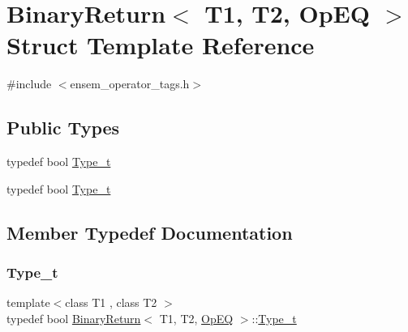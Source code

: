 \hypertarget{structBinaryReturn_3_01T1_00_01T2_00_01OpEQ_01_4}{}\section{Binary\+Return$<$ T1, T2, Op\+EQ $>$ Struct Template Reference}
\label{structBinaryReturn_3_01T1_00_01T2_00_01OpEQ_01_4}


{\ttfamily \#include $<$ensem\+\_\+operator\+\_\+tags.\+h$>$}

\subsection*{Public Types}
\begin{DoxyCompactItemize}
\item 
typedef bool \mbox{\hyperlink{structBinaryReturn_3_01T1_00_01T2_00_01OpEQ_01_4_a9dae4026d9a8e83b1f6b0d130201d5f5}{Type\+\_\+t}}
\item 
typedef bool \mbox{\hyperlink{structBinaryReturn_3_01T1_00_01T2_00_01OpEQ_01_4_a9dae4026d9a8e83b1f6b0d130201d5f5}{Type\+\_\+t}}
\end{DoxyCompactItemize}


\subsection{Member Typedef Documentation}
\mbox{\label{structBinaryReturn_3_01T1_00_01T2_00_01OpEQ_01_4_a9dae4026d9a8e83b1f6b0d130201d5f5}} 
\subsubsection{\texorpdfstring{Type\_t}{Type\_t}\hspace{0.1cm}{\footnotesize\ttfamily [1/2]}}
{\footnotesize\ttfamily template$<$class T1 , class T2 $>$ \\
typedef bool \mbox{\hyperlink{structBinaryReturn}{Binary\+Return}}$<$ T1, T2, \mbox{\hyperlink{structOpEQ}{Op\+EQ}} $>$\+::\mbox{\hyperlink{structBinaryReturn_3_01T1_00_01T2_00_01OpEQ_01_4_a9dae4026d9a8e83b1f6b0d130201d5f5}{Type\+\_\+t}}}

\mbox{\label{structBinaryReturn_3_01T1_00_01T2_00_01OpEQ_01_4_a9dae4026d9a8e83b1f6b0d130201d5f5}} 

